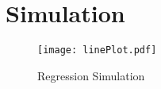 \documentclass[12pt,a4paper]{article}
\begin{document}
\section{Simulation}

\begin{figure}[!h]
  \centering
  \texttt{[image: linePlot.pdf]}
  \caption{Regression Simulation}
\end{figure}
\end{document}
